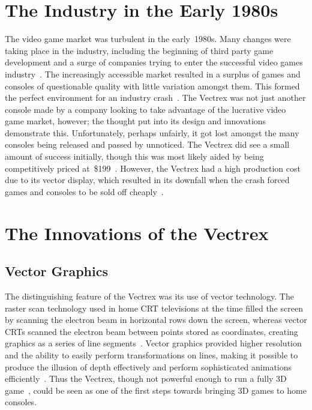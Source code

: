 \documentclass{scrartcl}
\begin{document}
\section*{The Industry in the Early 1980s}
The video game market was turbulent in the early~1980s. Many changes were taking place in the industry, including the beginning of third party game development and a surge of companies trying to enter the successful video games industry~\cite[p. 58]{wolf:pong}. The increasingly accessible market resulted in a surplus of games and consoles of questionable quality with little variation amongst them. This formed the perfect environment for an industry crash~\cite{ernkvist:crash}. The Vectrex was not just another console made by a company looking to take advantage of the lucrative video game market, however; the thought put into its design and innovations demonstrate this. Unfortunately, perhaps unfairly, it got lost amongst the many consoles being released and passed by unnoticed. The Vectrex did see a small amount of success initially, though this was most likely aided by being competitively priced at~\$199~\cite[p. 233]{kent:ultimate}. However, the Vectrex had a high production cost due to its vector display, which resulted in its downfall when the crash forced games and consoles to be sold off cheaply~\cite[p. 289]{baer:supercade}.



\section*{The Innovations of the Vectrex}


\subsection*{Vector Graphics}
The distinguishing feature of the Vectrex was its use of vector technology. The raster scan technology used in home CRT televisions at the time filled the screen by scanning the electron beam in horizontal rows down the screen, whereas vector CRTs scanned the electron beam between points stored as coordinates, creating graphics as a series of line segments~\cite[pp. 20--21]{wolf:medium}. Vector graphics provided higher resolution~\cite[pp. 155--156]{perron:theory} and the ability to easily perform transformations on lines, making it possible to produce the illusion of depth effectively and perform sophisticated animations efficiently~\cite{defanti:impact}. Thus the Vectrex, though not powerful enough to run a fully 3D game~\cite[pp. 155--156]{perron:theory}, could be seen as one of the first steps towards bringing 3D games to home consoles.
\end{document}
